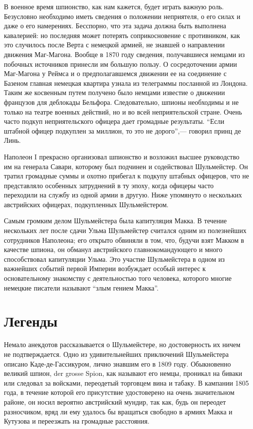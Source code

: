 \documentclass[
  oneside,
  12pt,
  titlepage]{book}
\begin{document}
В военное время шпионство, как нам кажется, будет играть важную роль. Безусловно необходимо иметь сведения о положении неприятеля, о его силах и даже о его намерениях. Бесспорно, что эта задача должна быть выполнена кавалерией: но последняя может потерять соприкосновение с противником, как это случилось после Верта с немецкой армией, не знавшей о направлении движения Маг-Магона. Вообще в 1870 году сведения, получавшиеся немцами из побочных источников принесли им большую пользу. О сосредоточении армии Маг-Магона у Реймса и о предполагавшемся движении ее на соединение с Базеном главная немецкая квартира узнала из телеграммы посланной из Лондона. Таким же косвенным путем получено было немцами известие о движении французов для деблокады Бельфора. Следовательно, шпионы необходимы и не только на театре военных действий, но и во всей неприятельской стране. Очень часто подкуп неприятельского офицера дает громадные результаты. ``Если штабной офицер подкуплен за миллион, то это не дорого'',--- говорил принц де Линь.

Наполеон I прекрасно организовал шпионство и возложил высшее руководство им на генерала Савари, которому был подчинен и содействовал Шульмейстер. Он тратил громадные суммы и охотно прибегал к подкупу штабных офицеров, что не представляло особенных затруднений в ту эпоху, когда офицеры часто переходили на службу из одной армии в другую. Ниже упомянуто о нескольких австрийских офицерах, подкупленных Шульмейстером.

Самым громким делом Шульмейстера была капитуляция Макка. В течение нескольких лет после сдачи Ульма Шульмейстер считался одним из полезнейших сотрудников Наполеона; его открыто обвиняли в том, что, будучи взят Макком в качестве шпиона, он обманул австрийского главнокомандующего и много способствовал капитуляции Ульма. Это участие Шульмейстера в одном из важнейших событий первой Империи возбуждает особый интерес к основательному знакомству с деятельностью того человека, которого многие немецкие писатели называют ``злым гением Макка''.

\hypertarget{ux43bux435ux433ux435ux43dux434ux44b}{%
\chapter{Легенды}\label{ux43bux435ux433ux435ux43dux434ux44b}}

Немало анекдотов рассказывается о Шульмейстере, но достоверность их ничем не подтверждается. Одно из удивительнейших приключений Шульмейстера описано Каде-де-Гассикуром, лично знавшим его в 1809 году. Обыкновенно великий шпион, der grosse Spion, как называют его немцы, проникал на биваки или следовал за войсками, переодетый торговцем вина и табаку. В кампании 1805 года, в течение которой его присутствие удостоверено на очень значительном районе, он носил вероятно австрийский мундир, так как, будь он переодет разносчиком, вряд ли ему удалось бы вращаться свободно в армиях Макка и Кутузова и переезжать на громадные расстояния.
\end{document}

